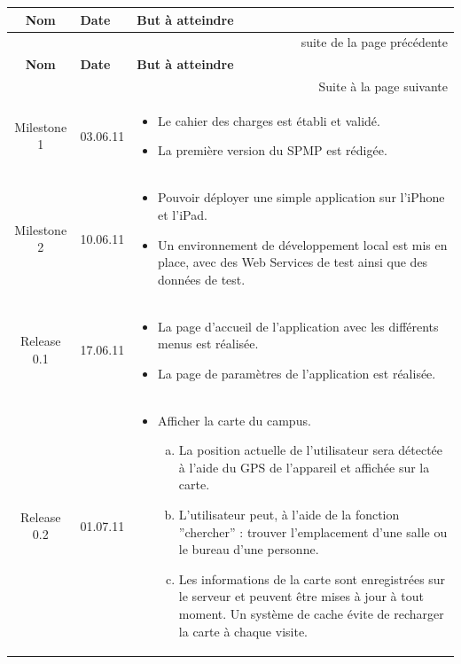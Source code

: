 \begin{longtable}{|c|l|p{10cm}|}
		 \hline  \textbf{Nom} & \textbf{Date}  & \textbf{But à atteindre}  \\ 
		 \endfirsthead
		  \multicolumn{3}{|r|}{{suite de la page précédente}} \\ \hline
		\hline  \textbf{Nom} & \textbf{Date}  & \textbf{But à atteindre}  \\ 
		 \endhead
		  \multicolumn{3}{|r|}{{Suite à la page suivante}} \\ \hline
		 \endfoot
		 \endlastfoot
		 \hline  Milestone 1 & 03.06.11  & 
		 	\begin{itemize}
		 	 		\item Le cahier des charges est établi et validé.
		 			\item La première version du \gls{SPMP} est rédigée.
		 	\end{itemize}   \\ 
		 \hline  Milestone 2 & 10.06.11  & 
		 	\begin{itemize}
		 	 		\item Pouvoir déployer une simple application sur l'iPhone et l'iPad.
		 			\item Un environnement de développement local est mis en place, avec des Web Services de test ainsi que des données de test.
		 	\end{itemize}   \\ 
	 	 \hline  Release 0.1 & 17.06.11  & 
		 	\begin{itemize}
		 	 		\item La page d'accueil de l'application avec les différents menus est réalisée.
		 			\item La page de paramètres de l'application est réalisée.
		 	\end{itemize}   \\ 
	 	 \hline  Release 0.2 & 01.07.11  & 
		 	\begin{itemize}
		 	 		\item Afficher la carte du campus.
		 	 		\begin{enumerate}[a)]
	 	 				\item La position actuelle de l'utilisateur sera détectée à l'aide du \gls{GPS} de l'appareil et affichée sur la carte.
	 	 				\item L'utilisateur peut, à l'aide de la fonction ''chercher'' : trouver l'emplacement d'une salle ou le bureau d'une personne.
	 	 				\item Les informations de la carte sont enregistrées sur le serveur et peuvent être mises à jour à tout moment. Un système de cache évite de recharger la carte à chaque visite.

\end{enumerate}
\end{itemize}
\end{longtable}
